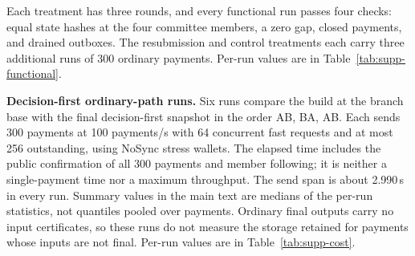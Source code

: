 Each treatment has three rounds, and every functional run passes four checks:
equal state hashes at the four committee members, a zero gap, closed
payments, and drained outboxes. The resubmission and control treatments each
carry three additional runs of 300 ordinary payments. Per-run values are in
Table~\ref{tab:supp-functional}.

\noindent\textbf{Decision-first ordinary-path runs.}
Six runs compare the build at the branch base with the final decision-first
snapshot in the order AB, BA, AB. Each sends 300 payments at 100 payments/s
with 64 concurrent fast requests and at most 256 outstanding, using NoSync
stress wallets. The elapsed time includes the public confirmation of all 300
payments and member following; it is neither a single-payment time nor a
maximum throughput. The send span is about 2.990\,s in every run. Summary
values in the main text are medians of the per-run statistics, not quantiles
pooled over payments. Ordinary final outputs carry no input certificates, so
these runs do not measure the storage retained for payments whose inputs are
not final. Per-run values are in Table~\ref{tab:supp-cost}.

